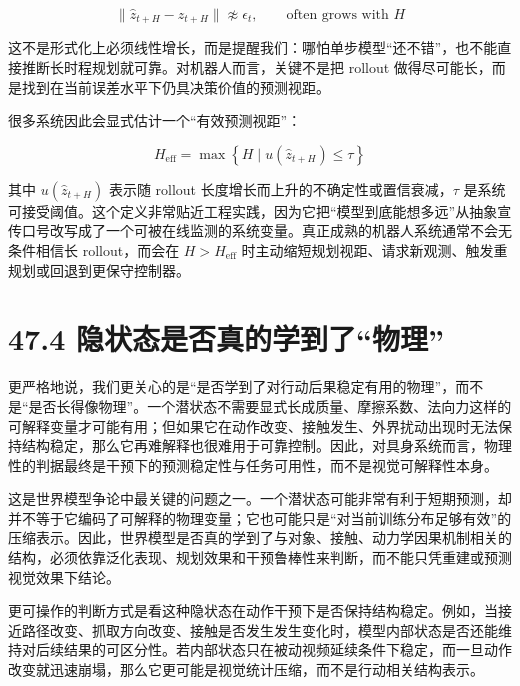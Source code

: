 \begingroup
\footnotesize
\begin{equation*}
\|\hat{z}_{t+H} - z_{t+H}\| \not\approx \epsilon_t,
\qquad
\text{often grows with } H
\end{equation*}
\endgroup

这不是形式化上必须线性增长，而是提醒我们：哪怕单步模型“还不错”，也不能直接推断长时程规划就可靠。对机器人而言，关键不是把 rollout 做得尽可能长，而是找到在当前误差水平下仍具决策价值的预测视距。

很多系统因此会显式估计一个“有效预测视距”：

\begingroup
\footnotesize
\begin{equation*}
H_{\mathrm{eff}} = \max \left\{ H \;|\; u(\hat{z}_{t+H}) \le \tau \right\}
\end{equation*}
\endgroup

其中 \(u(\hat{z}_{t+H})\) 表示随 rollout 长度增长而上升的不确定性或置信衰减，\(\tau\) 是系统可接受阈值。这个定义非常贴近工程实践，因为它把“模型到底能想多远”从抽象宣传口号改写成了一个可被在线监测的系统变量。真正成熟的机器人系统通常不会无条件相信长 rollout，而会在 \(H > H_{\mathrm{eff}}\) 时主动缩短规划视距、请求新观测、触发重规划或回退到更保守控制器。

\section*{47.4 隐状态是否真的学到了“物理”}


更严格地说，我们更关心的是“是否学到了对行动后果稳定有用的物理”，而不是“是否长得像物理”。一个潜状态不需要显式长成质量、摩擦系数、法向力这样的可解释变量才可能有用；但如果它在动作改变、接触发生、外界扰动出现时无法保持结构稳定，那么它再难解释也很难用于可靠控制。因此，对具身系统而言，物理性的判据最终是干预下的预测稳定性与任务可用性，而不是视觉可解释性本身。

这是世界模型争论中最关键的问题之一。一个潜状态可能非常有利于短期预测，却并不等于它编码了可解释的物理变量；它也可能只是“对当前训练分布足够有效”的压缩表示。因此，世界模型是否真的学到了与对象、接触、动力学因果机制相关的结构，必须依靠泛化表现、规划效果和干预鲁棒性来判断，而不能只凭重建或预测视觉效果下结论。

更可操作的判断方式是看这种隐状态在动作干预下是否保持结构稳定。例如，当接近路径改变、抓取方向改变、接触是否发生发生变化时，模型内部状态是否还能维持对后续结果的可区分性。若内部状态只在被动视频延续条件下稳定，而一旦动作改变就迅速崩塌，那么它更可能是视觉统计压缩，而不是行动相关结构表示。

